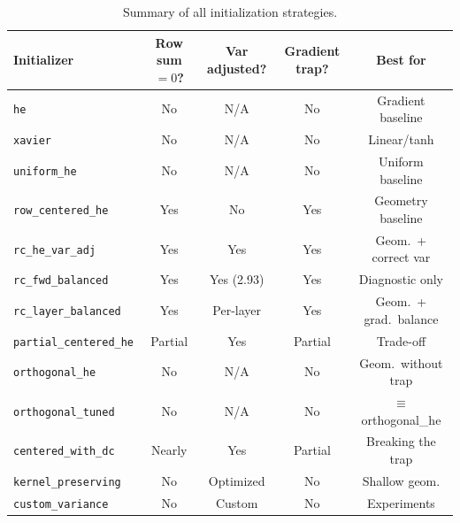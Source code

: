 \begin{table}[h]
\centering
\small
\begin{tabular}{lcccc}
\toprule
Initializer & Row sum $=0$? & Var adjusted? & Gradient trap? & Best for \\
\midrule
\texttt{he}                     & No      & N/A       & No      & Gradient baseline \\
\texttt{xavier}                 & No      & N/A       & No      & Linear/tanh \\
\texttt{uniform\_he}            & No      & N/A       & No      & Uniform baseline \\
\midrule
\texttt{row\_centered\_he}      & Yes     & No        & Yes     & Geometry baseline \\
\texttt{rc\_he\_var\_adj}       & Yes     & Yes       & Yes     & Geom.\ + correct var \\
\texttt{rc\_fwd\_balanced}      & Yes     & Yes (2.93)& Yes     & Diagnostic only \\
\texttt{rc\_layer\_balanced}    & Yes     & Per-layer & Yes     & Geom.\ + grad.\ balance \\
\midrule
\texttt{partial\_centered\_he}  & Partial & Yes       & Partial & Trade-off \\
\midrule
\texttt{orthogonal\_he}         & No      & N/A       & No      & Geom.\ without trap \\
\texttt{orthogonal\_tuned}      & No      & N/A       & No      & $\equiv$ orthogonal\_he \\
\midrule
\texttt{centered\_with\_dc}     & Nearly  & Yes       & Partial & Breaking the trap \\
\texttt{kernel\_preserving}     & No      & Optimized & No      & Shallow geom. \\
\texttt{custom\_variance}       & No      & Custom    & No      & Experiments \\
\bottomrule
\end{tabular}
\caption{Summary of all initialization strategies.}
\label{tab:init_summary}
\end{table}

